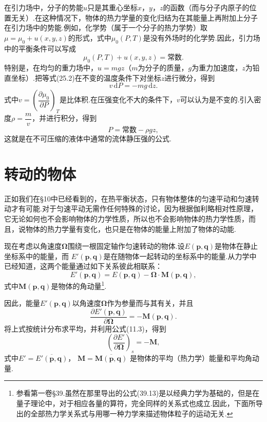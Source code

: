 在引力场中，分子的势能$u$只是其重心坐标$x$，$y$，$z$的函数（而与分子内原子的位置无关）.在这种情况下，物体的热力学量的变化归结为在其能量上再附加上分子在引力场中的势能.例如，化学势（属于一个分子的热力学势）取$\mu=\mu_0+u(x,y,z)$的形式，式中$\mu_0(P,T)$是没有外场时的化学势.因此，引力场中的平衡条件可以写成
\begin{equation}
  \mu_0(P,T)+u(x,y,z)=\text{常数.}
\end{equation}
特别是，在均匀的重力场中，$u=mgz$（$m$为分子的质量，$g$为重力加速度，$z$为铅直坐标）.把等式(25.2)在不变的温度条件下对坐标$z$进行微分，得到
\begin{equation*}
  v\,\mathrm{d}P=-mg\,\mathrm{d}z.
\end{equation*}
式中$v=\left(\dfrac{\partial\mu_0}{\partial P}\right)_T$是比体积.在压强变化不大的条件下，$v$可以认为是不变的.引入密度$\rho=\dfrac{m}{v}$，并进行积分，得到
\begin{equation*}
  P=\text{常数}-\rho gz,
\end{equation*}
这就是在不可压缩的液体中通常的流体静压强的公式.

\section{转动的物体}

正如我们在§10中已经看到的，在热平衡状态，只有物体整体的匀速平动和匀速转动才有可能.对于匀速平动无需作任何特殊的讨论，因为根据伽利略相对性原理，它无论如何也不会影响物体的力学性质，所以也不会影响物体的热力学性质，而且，说物体的热力学量有变化，也只是在物体的能量上附加了物体的动能.

现在考虑以角速度$\boldsymbol{\Omega}$围绕一根固定轴作匀速转动的物体.设$E(\boldsymbol{p},\boldsymbol{q})$是物体在静止坐标系中的能量，而
$E'(\boldsymbol{p},\boldsymbol{q})$是在随物体一起转动的坐标系中的能量.从力学中已经知道，这两个能量通过如下关系彼此相联系：
\begin{equation}
  E'(\boldsymbol{p},\boldsymbol{q})
  =E(\boldsymbol{p},\boldsymbol{q})
  -\boldsymbol{\Omega}\cdot\boldsymbol{M}(\boldsymbol{p},\boldsymbol{q}),
\end{equation}
式中$\boldsymbol{M}(\boldsymbol{p},\boldsymbol{q})$是物体的角动量\footnote{参看第一卷§39.虽然在那里导出的公式(39.13)是以经典力学为基础的，但是在量子理论中，对于相应各量的算符，完全同样的关系式也成立.因此，下面所导出的全部热力学关系式与用哪一种力学来描述物体粒子的运动无关.}.

因此，能量$E'(\boldsymbol{p},\boldsymbol{q})$以角速度$\boldsymbol{\Omega}$作为参量而与其有关，并且
\begin{equation*}
  \frac{\partial E'(\boldsymbol{p},\boldsymbol{q})}
  {\partial\boldsymbol{\Omega}}
  =-\boldsymbol{M}(\boldsymbol{p},\boldsymbol{q}).
\end{equation*}
将上式按统计分布求平均，并利用公式(11.3)，得到
\begin{equation}
  \left(\frac{\partial E'}{\partial\boldsymbol{\Omega}}\right)_s
  =-\boldsymbol{M},
\end{equation}
式中$E'=\overline{E'(\boldsymbol{p},\boldsymbol{q})}$，
$\boldsymbol{M}=\overline{\boldsymbol{M}(\boldsymbol{p},\boldsymbol{q})}$
是物体的平均（热力学）能量和平均角动量.

